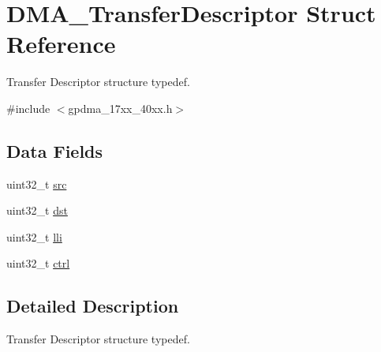 \hypertarget{structDMA__TransferDescriptor}{\section{D\-M\-A\-\_\-\-Transfer\-Descriptor Struct Reference}
\label{structDMA__TransferDescriptor}
}


Transfer Descriptor structure typedef.  




{\ttfamily \#include $<$gpdma\-\_\-17xx\-\_\-40xx.\-h$>$}

\subsection*{Data Fields}
\begin{DoxyCompactItemize}
\item 
uint32\-\_\-t \hyperlink{structDMA__TransferDescriptor_a03862efce0e0845dce0cd47e51ed038f}{src}
\item 
uint32\-\_\-t \hyperlink{structDMA__TransferDescriptor_a661ff33fa31f405b89905f385299e271}{dst}
\item 
uint32\-\_\-t \hyperlink{structDMA__TransferDescriptor_ad53035ccb28664c56800a73bb20a7c79}{lli}
\item 
uint32\-\_\-t \hyperlink{structDMA__TransferDescriptor_a6b9f6124eb0961c8ccea5c455d135e60}{ctrl}
\end{DoxyCompactItemize}


\subsection{Detailed Description}
Transfer Descriptor structure typedef. 

